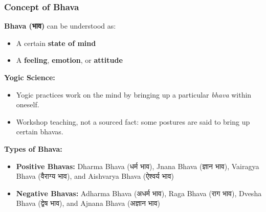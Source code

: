         
        


\begin{frame}[fragile]\frametitle{Concept of Bhava}
    \textbf{Bhava (भाव)} can be understood as:
    \begin{itemize}
        \item A certain \textbf{state of mind}
        \item A \textbf{feeling}, \textbf{emotion}, or \textbf{attitude}
    \end{itemize}

    \textbf{Yogic Science:}
    \begin{itemize}
        \item Yogic practices work on the mind by bringing up a particular \textit{bhava} within oneself.
        \item Workshop teaching, not a sourced fact: some postures are said to bring up certain bhavas.
    \end{itemize}

    \textbf{Types of Bhava:}
    \begin{itemize}
        \item \textbf{Positive Bhavas:} Dharma Bhava (धर्म भाव), Jnana Bhava (ज्ञान भाव), Vairagya Bhava (वैराग्य भाव), and Aishvarya Bhava (ऐश्वर्य भाव)
        \item \textbf{Negative Bhavas:} Adharma Bhava (अधर्म भाव), Raga Bhava (राग भाव), Dvesha Bhava (द्वेष भाव), and Ajnana Bhava (अज्ञान भाव)
    \end{itemize}
\end{frame}


